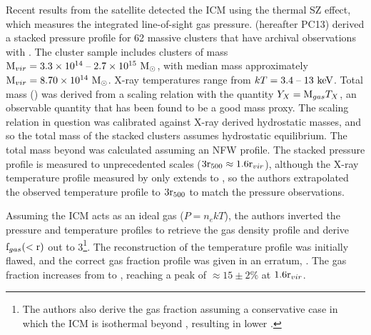 Recent results from the \Planck{} satellite detected the ICM using the
thermal SZ effect, which measures the integrated line-of-sight gas
pressure. \textbf{\citet{PlanckIntV}} (hereafter PC13) derived a
stacked pressure profile for 62 massive clusters that have archival
observations with \XMM. The cluster sample \citep[detailed
  in][]{PlanckEarlyXI} includes clusters of mass $\textrm{M\ensuremath{_{vir}}} =
3.3\times 10^{14}\;\textrm{--}\;2.7 \times 10^{15}~\textrm{M}_\odot$, with median mass
approximately $\textrm{M\ensuremath{_{vir}}} = 8.70 \times 10^{14}~\textrm{M}_\odot$. X-ray temperatures
range from $kT = 3.4\;\textrm{--}\;13~\textrm{keV}$. Total mass (\Mfive) was derived
from a scaling relation with the quantity $Y_X =
\textrm{M}_{gas}T_X$, an observable quantity that has
been found to be a good mass proxy. The scaling relation in question
\citep{Arnaud2010} was calibrated against X-ray derived hydrostatic
masses, and so the total mass of the stacked \Planck{}
clusters assumes hydrostatic equilibrium. The total mass beyond
\rfive{} was calculated assuming an NFW profile. The stacked pressure
profile is measured to unprecedented scales ($3\textrm{r\ensuremath{_{500}}} \approx
1.6\textrm{r\ensuremath{_{vir}}}$), although the X-ray temperature profile measured by \XMM{}
only extends to \rfive{}, so the authors extrapolated the observed
temperature profile to $3\textrm{r\ensuremath{_{500}}}{}$ to match the pressure observations.

Assuming the ICM acts as an ideal gas ($P=n_ekT$), the authors inverted the pressure
and temperature profiles to retrieve the gas density profile and
derive $\textrm{f\ensuremath{_{gas}}}{}(<\textrm{r})$ out to 3\rfive{}\footnote{The authors also
  derive the gas fraction assuming a conservative case in which the
  ICM is isothermal beyond \rfive{}, resulting in lower \fg{}.}. The
reconstruction of the temperature profile was initially flawed, and
the correct gas fraction profile was given in an erratum,
\citet{PlanckIntVb}. The gas fraction increases from \rfive{} to \rvir{}
\citep[as predicted by][see \ref{sec:Gas.Extrapolation}]{Rasheed2011},
reaching a peak of $\approx 15\pm2\%$ at $1.6\textrm{r\ensuremath{_{vir}}}{}$.

